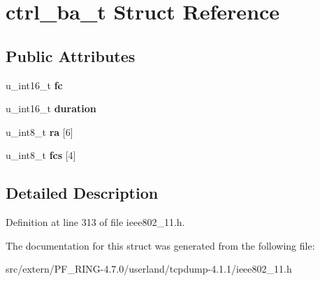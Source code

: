 \hypertarget{structctrl__ba__t}{
\section{ctrl\_\-ba\_\-t Struct Reference}
\label{structctrl__ba__t}
}
\subsection*{Public Attributes}
\begin{DoxyCompactItemize}
\item 
\hypertarget{structctrl__ba__t_a7f96c30dc02b67f40c510cb7e553a485}{
u\_\-int16\_\-t {\bfseries fc}}
\label{structctrl__ba__t_a7f96c30dc02b67f40c510cb7e553a485}

\item 
\hypertarget{structctrl__ba__t_af08420431faecab15cf2e1d46701dd38}{
u\_\-int16\_\-t {\bfseries duration}}
\label{structctrl__ba__t_af08420431faecab15cf2e1d46701dd38}

\item 
\hypertarget{structctrl__ba__t_a71bf74d481adfbb2a4a77a89f5b9c8be}{
u\_\-int8\_\-t {\bfseries ra} \mbox{[}6\mbox{]}}
\label{structctrl__ba__t_a71bf74d481adfbb2a4a77a89f5b9c8be}

\item 
\hypertarget{structctrl__ba__t_a94d1ff40078b35524ce31b797bfaad77}{
u\_\-int8\_\-t {\bfseries fcs} \mbox{[}4\mbox{]}}
\label{structctrl__ba__t_a94d1ff40078b35524ce31b797bfaad77}

\end{DoxyCompactItemize}


\subsection{Detailed Description}


Definition at line 313 of file ieee802\_\-11.h.



The documentation for this struct was generated from the following file:\begin{DoxyCompactItemize}
\item 
src/extern/PF\_\-RING-\/4.7.0/userland/tcpdump-\/4.1.1/ieee802\_\-11.h\end{DoxyCompactItemize}

